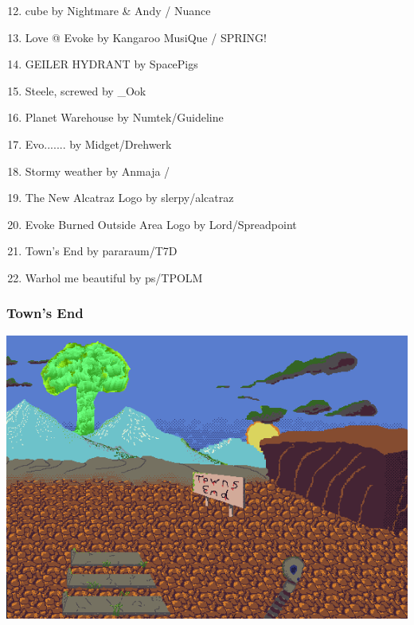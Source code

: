 \documentclass{beamer}
\begin{document}
\begin{frame}
  \begin{enumerate}
    \setcounter{enumi}{11}
  \item cube by Nightmare \& Andy / Nuance
  \item Love @ Evoke by Kangaroo MusiQue / SPRING!
  \item GEILER HYDRANT by SpacePigs
  \item Steele, screwed by \_Ook
  \item Planet Warehouse by Numtek/Guideline
  \item Evo....... by Midget/Drehwerk
  \item Stormy weather  by Anmaja /
  \item The New Alcatraz Logo by slerpy/alcatraz
  \item Evoke Burned Outside Area Logo by Lord/Spreadpoint
  \item Town's End by pararaum/T7D
  \item Warhol me beautiful by ps/TPOLM
  \end{enumerate}
\end{frame}

\begin{frame}
  \frametitle{Town's End}
  \includegraphics[width=\textwidth]{towns_end}
\end{frame}
\end{document}
